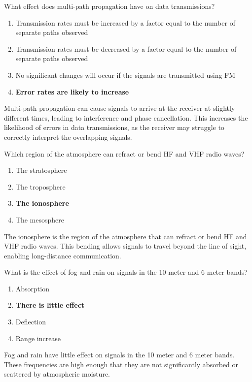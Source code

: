 \begin{tcolorbox}[colback=gray!10!white,colframe=black!75!black,title={T3A10}]
    What effect does multi-path propagation have on data transmissions?
    \begin{enumerate}[label=\Alph*),noitemsep]
        \item Transmission rates must be increased by a factor equal to the number of separate paths observed
        \item Transmission rates must be decreased by a factor equal to the number of separate paths observed
        \item No significant changes will occur if the signals are transmitted using FM
        \item \textbf{Error rates are likely to increase}
    \end{enumerate}
\end{tcolorbox}
Multi-path propagation can cause signals to arrive at the receiver at slightly different times, leading to interference and phase cancellation. This increases the likelihood of errors in data transmissions, as the receiver may struggle to correctly interpret the overlapping signals.

\begin{tcolorbox}[colback=gray!10!white,colframe=black!75!black,title={T3A11}]
    Which region of the atmosphere can refract or bend HF and VHF radio waves?
    \begin{enumerate}[label=\Alph*),noitemsep]
        \item The stratosphere
        \item The troposphere
        \item \textbf{The ionosphere}
        \item The mesosphere
    \end{enumerate}
\end{tcolorbox}
The ionosphere is the region of the atmosphere that can refract or bend HF and VHF radio waves. This bending allows signals to travel beyond the line of sight, enabling long-distance communication.

\begin{tcolorbox}[colback=gray!10!white,colframe=black!75!black,title={T3A12}]
    What is the effect of fog and rain on signals in the 10 meter and 6 meter bands?
    \begin{enumerate}[label=\Alph*),noitemsep]
        \item Absorption
        \item \textbf{There is little effect}
        \item Deflection
        \item Range increase
    \end{enumerate}
\end{tcolorbox}
Fog and rain have little effect on signals in the 10 meter and 6 meter bands. These frequencies are high enough that they are not significantly absorbed or scattered by atmospheric moisture.

